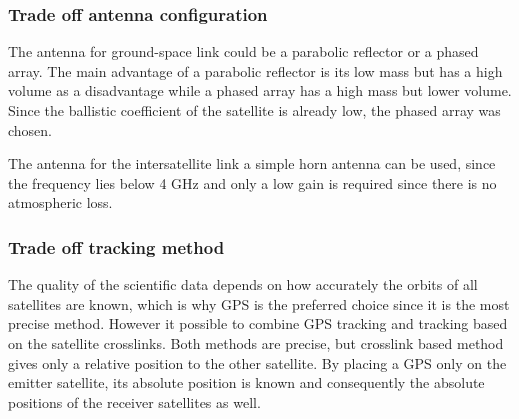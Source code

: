 \subsubsection{Trade off antenna configuration}
The antenna for ground-space link could be a parabolic reflector or a phased array. The main advantage of a parabolic reflector is its low mass but has a high volume as a disadvantage while a phased array has a high mass but lower volume. Since the ballistic coefficient of the satellite is already low, the phased array was chosen.

The antenna for the intersatellite link a simple horn antenna can be used, since the frequency lies below 4 GHz and only a low gain is required since there is no atmospheric loss.

\subsubsection{Trade off tracking method}
The quality of the scientific data depends on how accurately the orbits of all satellites are known, which is why GPS is the preferred choice since it is the most precise method. However it possible to combine GPS tracking and tracking based on the satellite crosslinks. Both methods are precise, but crosslink based method gives only a relative position to the other satellite. By placing a GPS only on the emitter satellite, its absolute position is known and consequently the absolute positions of the receiver satellites as well.
